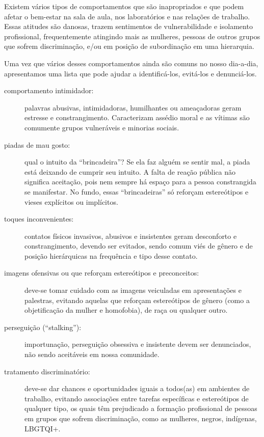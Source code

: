 \documentclass[twoside a4paper 12pt]{report}
\begin{document}
Existem vários tipos de comportamentos que são inapropriados e que podem afetar o bem-estar na sala de aula, nos laboratórios e nas relações de trabalho. Essas atitudes são danosas, trazem sentimentos de vulnerabilidade e isolamento profissional, frequentemente atingindo mais as mulheres, pessoas de outros grupos que sofrem discriminação, e/ou em posição de subordinação em uma hierarquia. 

Uma vez que vários desses comportamentos ainda são comuns no nosso dia-a-dia, apresentamos uma lista que pode ajudar a identificá-los, evitá-los e denunciá-los.

\begin{description}

\item[comportamento intimidador:] palavras abusivas, intimidadoras, humilhantes ou ameaçadoras geram estresse e constrangimento. Caracterizam assédio moral e as vítimas são comumente grupos vulneráveis e minorias sociais.

\item[piadas de mau gosto:] qual o intuito da “brincadeira”? Se ela faz alguém se sentir mal, a piada está deixando de cumprir seu intuito. A falta de reação pública não significa aceitação, pois nem sempre há espaço para a pessoa constrangida se manifestar. No fundo, essas “brincadeiras” só reforçam estereótipos e vieses explícitos ou implícitos.

\item[toques inconvenientes:] contatos físicos invasivos, abusivos e insistentes geram desconforto e constrangimento, devendo ser evitados, sendo comum viés de gênero e de posição hierárquicas na frequência e tipo desse contato.

\item[imagens ofensivas ou que reforçam estereótipos e preconceitos:] deve-se tomar cuidado com as imagens veiculadas em apresentações e palestras, evitando aquelas que reforçam estereótipos de gênero (como a objetificação da mulher e homofobia), de raça ou qualquer outro.

\item[perseguição (“stalking”):] importunação, perseguição obsessiva e insistente devem ser denunciados, não sendo aceitáveis em nossa comunidade.

\item[tratamento discriminatório:] deve-se dar chances e oportunidades iguais a todos(as) em ambientes de trabalho, evitando associações entre tarefas específicas e estereótipos de qualquer tipo, os quais têm prejudicado a formação profissional de pessoas em grupos que sofrem discriminação, como as mulheres, negros, indígenas, LBGTQI+. 
\end{description}
\end{document}
